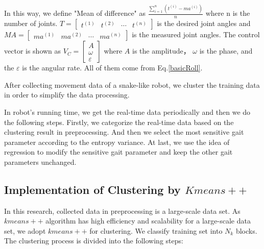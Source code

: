 In this way, we define "Mean of difference" as $\frac{\sum_{i=1}^{n}(t^{(i)}-ma^{(i)})}{n} $ where n is the number of joints. $T=\begin{bmatrix}
t^{(1)} & t^{(2)} & \cdots & t^{(n)}
\end{bmatrix}$ is the desired joint angles and $MA=\begin{bmatrix}
ma^{(1)} & ma^{(2)} & \cdots & ma^{(n)}
\end{bmatrix}$ is the measured joint angles. The control vector is shown as
$V_C=\begin{bmatrix}
A\\ 
\omega\\
\varepsilon
\end{bmatrix}$
where $A$ is the amplitude， $\omega$ is the phase, and the $\varepsilon$ is the angular rate. All of them come from Eq.\ref{basicRoll}.

After collecting movement data of a snake-like robot, we cluster the training data in order to simplify the data processing.

In robot's running time, we get the real-time data periodically and then we do the following steps. Firstly, we categorize the real-time data based on the clustering result in preprocessing. And then we select the most sensitive gait parameter according to the entropy variance. At last, we use the idea of regression to modify the sensitive gait parameter and keep the other gait parameters unchanged.

\subsection{Implementation of Clustering by $Kmeans++$}
In this research, collected data in preprocessing is a large-scale data set. As $kmeans++$ algorithm has high efficiency and scalability for a large-scale data set, we adopt $kmeans++$ for clustering. We classify training set into $N_{k}$ blocks. The clustering process is divided into the following steps:

